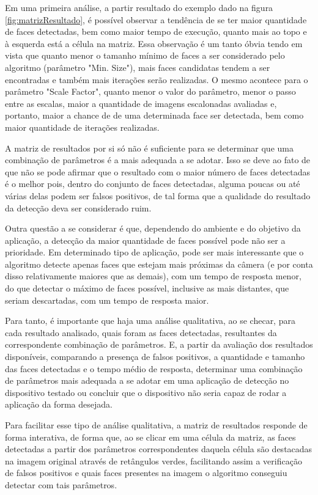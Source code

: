 Em uma primeira análise, a partir resultado do exemplo dado na figura \ref{fig:matrizResultado}, é possível observar a tendência de se ter maior quantidade de faces detectadas, bem como maior tempo de execução, quanto mais ao topo e à esquerda está a célula na matriz. Essa observação é um tanto óbvia tendo em vista que quanto menor o tamanho mínimo de faces a ser considerado pelo algoritmo (parâmetro "Min. Size"), mais faces candidatas tendem a ser encontradas e também mais iterações serão realizadas. O mesmo acontece para o parâmetro "Scale Factor", quanto menor o valor do parâmetro, menor o passo entre as escalas, maior a quantidade de imagens escalonadas avaliadas e, portanto, maior a chance de de uma determinada face ser detectada, bem como maior quantidade de iterações realizadas.

A matriz de resultados por si só não é suficiente para se determinar que uma combinação de parâmetros é a mais adequada a se adotar. Isso se deve ao fato de que não se pode afirmar que o resultado com o maior número de faces detectadas é o melhor pois, dentro do conjunto de faces detectadas, alguma poucas ou até várias delas podem ser falsos positivos, de tal forma que a qualidade do resultado da detecção deva ser considerado ruim.

Outra questão a se considerar é que, dependendo do ambiente e do objetivo da aplicação, a detecção da maior quantidade de faces possível pode não ser a prioridade. Em determinado tipo de aplicação, pode ser mais interessante que o algoritmo detecte apenas faces que estejam mais próximas da câmera (e por conta disso relativamente maiores que as demais), com um tempo de resposta menor, do que detectar o máximo de faces possível, inclusive as mais distantes, que seriam descartadas, com um tempo de resposta maior.

Para tanto, é importante que haja uma análise qualitativa, ao se checar, para cada resultado analisado, quais foram as faces detectadas, resultantes da correspondente combinação de parâmetros. E, a partir da avaliação dos resultados disponíveis, comparando a presença de falsos positivos, a quantidade e tamanho das faces detectadas e o tempo médio de resposta, determinar uma combinação de parâmetros mais adequada a se adotar em uma aplicação de detecção no dispositivo testado ou concluir que o dispositivo não seria capaz de rodar a aplicação da forma desejada.

Para facilitar esse tipo de análise qualitativa, a matriz de resultados responde de forma interativa, de forma que, ao se clicar em uma célula da matriz, as faces detectadas a partir dos parâmetros correspondentes daquela célula são destacadas na imagem original através de retângulos verdes, facilitando assim a verificação de falsos positivos e quais faces presentes na imagem o algoritmo conseguiu detectar com tais parâmetros.

